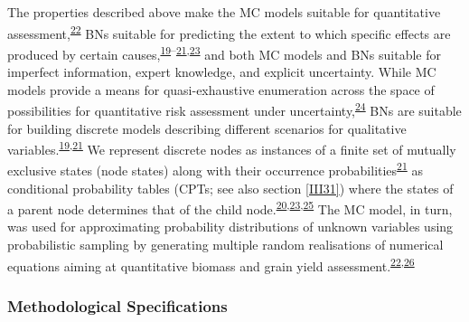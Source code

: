 \documentclass[12pt,oneside]{article}
\begin{document}
The properties described above make the MC models suitable for quantitative assessment,\textsuperscript{\protect\hyperlink{ref-Hubbard_2014}{22}} BNs suitable for predicting the extent to which specific effects are produced by certain causes,\textsuperscript{\protect\hyperlink{ref-Pearl_1988}{19}--\protect\hyperlink{ref-Jensen_1996}{21},\protect\hyperlink{ref-Scutari_and_Denis_2015}{23}} and both MC models and BNs suitable for imperfect information, expert knowledge, and explicit uncertainty. While MC models provide a means for quasi-exhaustive enumeration across the space of possibilities for quantitative risk assessment under uncertainty,\textsuperscript{\protect\hyperlink{ref-Rosenstock_et_al_2014}{24}} BNs are suitable for building discrete models describing different scenarios for qualitative variables.\textsuperscript{\protect\hyperlink{ref-Pearl_1988}{19},\protect\hyperlink{ref-Jensen_1996}{21}} We represent discrete nodes as instances of a finite set of mutually exclusive states (node states) along with their occurrence probabilities\textsuperscript{\protect\hyperlink{ref-Jensen_1996}{21}} as conditional probability tables (CPTs; see also section \ref{III31}) where the states of a parent node determines that of the child node.\textsuperscript{\protect\hyperlink{ref-Fenton_and_Neil_2013}{20},\protect\hyperlink{ref-Scutari_and_Denis_2015}{23},\protect\hyperlink{ref-Jensen_and_Nielsen_2007}{25}} The MC model, in turn, was used for approximating probability distributions of unknown variables using probabilistic sampling by generating multiple random realisations of numerical equations aiming at quantitative biomass and grain yield assessment.\textsuperscript{\protect\hyperlink{ref-Hubbard_2014}{22},\protect\hyperlink{ref-Luedeling_et_al_2015}{26}}

\hypertarget{III12}{%
\subsubsection{Methodological Specifications}\label{III12}}
\end{document}
